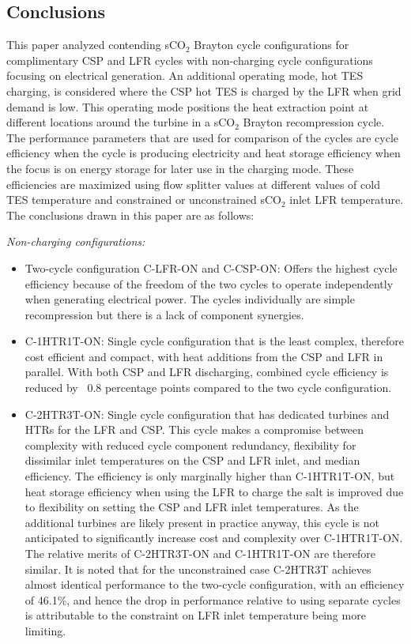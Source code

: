\begin{paracol}{2}
\section{Conclusions}

This paper analyzed contending sCO$_2$ Brayton cycle configurations for complimentary CSP and LFR cycles with non-charging cycle configurations focusing on electrical generation. An additional operating mode, hot TES charging, is considered where the CSP hot TES is charged by the LFR when grid demand is low. This operating mode positions the heat extraction point at different locations around the turbine in a sCO$_2$ Brayton recompression cycle. The performance parameters that are used for comparison of the cycles are cycle efficiency when the cycle is producing electricity and heat storage efficiency when the focus is on energy storage for later use in the charging mode. These efficiencies are maximized using flow splitter values at different values of cold TES temperature and constrained or unconstrained sCO$_2$ inlet LFR temperature. The conclusions drawn in this paper are as follows:

\textit{Non-charging configurations:}
\begin{itemize}
    \item	Two-cycle configuration C-LFR-ON and C-CSP-ON: Offers the highest cycle efficiency because of the freedom of the two cycles to operate independently when generating electrical power. The cycles individually are simple recompression but there is a lack of component synergies.
    \item	C-1HTR1T-ON: Single cycle configuration that is the least complex, therefore cost efficient and compact, with heat additions from the CSP and LFR in parallel. With both CSP and LFR discharging, combined cycle efficiency is reduced by ~0.8 percentage points compared to the two cycle configuration. 
    \item   C-2HTR3T-ON: Single cycle configuration that has dedicated turbines and HTRs for the LFR and CSP. This cycle makes a compromise between complexity with reduced cycle component redundancy, flexibility for dissimilar inlet temperatures on the CSP and LFR inlet, and median efficiency. The efficiency is only marginally higher than C-1HTR1T-ON, but heat storage efficiency when using the LFR to charge the salt is improved due to flexibility on setting the CSP and LFR inlet temperatures. As the additional turbines are likely present in practice anyway, this cycle is not anticipated to significantly increase cost and complexity over C-1HTR1T-ON. The relative merits of C-2HTR3T-ON and C-1HTR1T-ON are therefore similar. It is noted that for the unconstrained case C-2HTR3T achieves almost identical performance to the two-cycle configuration, with an efficiency of 46.1\%, and hence the drop in performance relative to using separate cycles is attributable to the constraint on LFR inlet temperature being more limiting.
\end{itemize}


\end{paracol}
